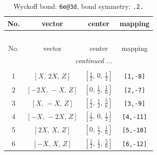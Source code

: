 \documentclass[fleqn,8pt]{jsarticle}
\begin{document}
\renewcommand{\arraystretch}{1.2}
\begin{longtable}{cccc}
\caption{Wyckoff bond: {\tt 6e@3d}, bond symmetry: {\tt .2.}}
 \\
 \hline \hline
No. & vector & center & mapping \\ \hline \endfirsthead

\multicolumn{3}{l}{\tablename\ \thetable{}} \\
 \hline \hline
No. & vector & center & mapping \\ \hline \endhead

 \hline \hline
\multicolumn{3}{r}{\footnotesize\it continued ...} \\ \endfoot

 \hline \hline
\multicolumn{3}{r}{} \\ \endlastfoot

1 & $\left[ X,\, 2 X,\, Z \right]$ & $\left[ \frac{1}{2},\, 0,\, \frac{1}{2} \right]$ & {\tt [1,-8]} \\ \hline
2 & $\left[ - 2 X,\, - X,\, Z \right]$ & $\left[ 0,\, \frac{1}{2},\, \frac{1}{6} \right]$ & {\tt [2,-7]} \\ \hline
3 & $\left[ X,\, - X,\, Z \right]$ & $\left[ \frac{1}{2},\, \frac{1}{2},\, \frac{5}{6} \right]$ & {\tt [3,-9]} \\ \hline
4 & $\left[ - X,\, - 2 X,\, Z \right]$ & $\left[ \frac{1}{2},\, 0,\, \frac{1}{2} \right]$ & {\tt [4,-11]} \\ \hline
5 & $\left[ 2 X,\, X,\, Z \right]$ & $\left[ 0,\, \frac{1}{2},\, \frac{1}{6} \right]$ & {\tt [5,-10]} \\ \hline
6 & $\left[ - X,\, X,\, Z \right]$ & $\left[ \frac{1}{2},\, \frac{1}{2},\, \frac{5}{6} \right]$ & {\tt [6,-12]} \\
\end{longtable}
\renewcommand{\arraystretch}{1.2}
\end{document}
